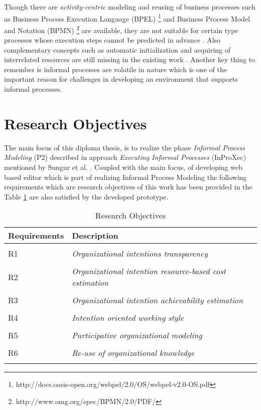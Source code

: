 Though there are \textit{activity-centric} modeling and reusing of business processes such as Business Process Execution Language (BPEL) \footnote{http://docs.oasis-open.org/wsbpel/2.0/OS/wsbpel-v2.0-OS.pdf} and Business Process Model and Notation (BPMN) \footnote{http://www.omg.org/spec/BPMN/2.0/PDF/} are available, they are not suitable for certain type processes whose execution steps cannot be predicted in advance \cite{Sungur2014a}. Also complementary concepts such as automatic initialization and acquiring of interrelated resources are still missing in the existing work \cite{Sungur2015}. Another key thing to remember is informal processes are volatile in nature which is one of the important reason for challenges in developing an environment that supports informal processes.

\section {Research Objectives}
\label{sec:researchobjectives}
The main focus of this diploma thesis, is to realize the phase \textit{Informal Process Modeling} (P2) described in approach \textit{Executing Informal Processes} (InProXec) mentioned by Sungur et al. \cite{Sungur2015}. Coupled with the main focus, of developing web based editor which is part of realizing Informal Process Modeling the following requirements which are research objectives of this work has been provided in the Table \ref{tab:researchobjectives} are also satisfied by the developed prototype. 

\label{sec:researchobj}
\begin{center}
	\begin{longtable}{p{5cm}p{11cm}} 
   	\toprule 
	\textbf{Requirements} & \textbf{Description} \\
	\midrule
	\endfirsthead
	\\
	R1 & \textit{Organizational intentions transparency}  \label{ro1} \\
	\\[-1.5ex]
	R2 & \textit{Organizational intention resource-based cost estimation}  \label{ro2} \\
	\\[-1.5ex]
	R3 & \textit{Organizational intention achievability estimation} \label{ro3}\\
	\\[-1.5ex]
	R4 & \textit{Intention oriented working style}  \label{ro4}\\
	\\[-1.5ex]
	R5 & \textit{Participative organizational modeling}\label{ro5}\\
	\\[-1.5ex]
	R6 & \textit{Re-use of organizational knowledge} \label{ro6}\\
	
	\bottomrule
	\caption{Research Objectives}
	\label{tab:researchobjectives}
	\end{longtable}	
\end{center}

